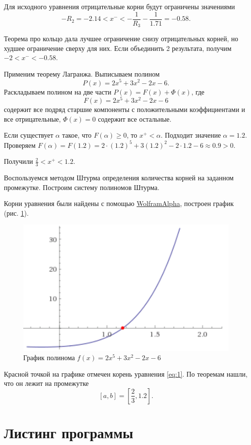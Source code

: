 Для исходного уравнения отрицательные корни будут ограничены значениями
$$- R_2 =
- 2.14 <
x^{-} <
- \frac{1}{R_3} 
- \frac{1}{1.71} =
- 0.58.$$

Теорема про кольцо дала лучшее ограничение снизу отрицательных корней, но худшее ограничение сверху для них.
Если объединить 2 результата, получим $- 2 < x^{-} < - 0.58$.

Применим теорему Лагранжа.
Выписываем полином
$$P \left( x \right) = 2x^5 + 3x^2 - 2x - 6.$$
Раскладываем полином на две части $P \left( x \right) = F \left( x \right) + \Phi \left( x \right) $,
где
$$F \left( x \right) = 2x^5 + 3x^2 - 2x - 6$$
содержит все подряд старшие компоненты с положительными коэффициентами и все отрицательные,
$ \Phi \left( x \right) = 0$ содержит все остальные.

Если существует $ \alpha $ такое, что $F \left( \alpha \right) \geq 0$, то $x^{+} < \alpha $.
Подходит значение $ \alpha = 1.2$.
Проверяем
$F \left( \alpha \right) =
F \left( 1.2 \right) =
2 \cdot \left( 1.2 \right)^5 + 3 \left( 1.2 \right)^2 - 2 \cdot 1.2 - 6 \approx 0.9 > 0$.

Получили $ \frac{2}{3} < x^{+} < 1.2$.

Воспользуемся методом Штурма определения количества корней на заданном промежутке.
Построим систему полиномов Штурма.

\lstset{inputencoding=utf8, extendedchars=\true}


Корни уравнения были найдены с помощью \href{http://www.wolframalpha.com}{WolframAlpha}, построен график (рис. \ref{fig:plot}).

\begin{figure}[h!]
  \centering
  \includegraphics[width=.3\textwidth]{plot.png}
  \caption{График полинома $f \left( x \right) = 2x^5 + 3x^2 - 2x - 6$}
\label{fig:plot}
\end{figure}

Красной точкой на графике отмечен корень уравнения \ref{eq:1}.
По теоремам нашли, что он лежит на промежутке
$$ \left[ a, b \right] = \left[ \frac{2}{3}, 1.2 \right].$$

\chapter{Листинг программы}

